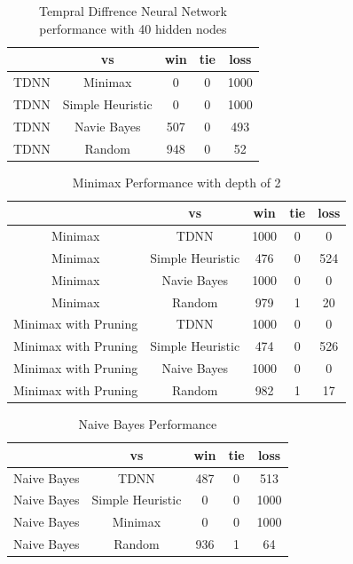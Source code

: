 \documentclass[12pt,letterpaper]{article}
\begin{document}
\begin{table}
\begin{center}
\begin{tabular}{|c||c|c|c|c|}
\hline
& vs & win & tie & loss\\
\hline \hline
TDNN & Minimax & 0 & 0 & 1000\\
\hline 
TDNN & Simple Heuristic & 0 & 0 & 1000\\
\hline 
TDNN & Navie Bayes & 507 & 0 & 493\\
\hline 
TDNN & Random & 948 & 0 & 52\\
\hline 
\end{tabular}
\end{center}
\caption{Tempral Diffrence Neural Network performance with 40 hidden nodes}
\label{TDNNtable}
\end{table}

\begin{table}
\begin{center}
\begin{tabular}{|c||c|c|c|c|}
\hline
& vs & win & tie & loss\\
\hline \hline
Minimax & TDNN & 1000 & 0 & 0\\
\hline 
Minimax & Simple Heuristic & 476 & 0 & 524\\
\hline 
Minimax & Navie Bayes & 1000 & 0 & 0\\
\hline 
Minimax & Random & 979 & 1 & 20\\
\hline 
Minimax with Pruning & TDNN & 1000 & 0 & 0\\
\hline 
Minimax with Pruning & Simple Heuristic & 474 & 0 & 526\\
\hline 
Minimax with Pruning & Naive Bayes & 1000 & 0 & 0\\
\hline 
Minimax with Pruning & Random & 982 & 1 & 17\\
\hline 
\end{tabular}
\end{center}
\caption{Minimax Performance with depth of 2}
\label{MinimaxTable}
\end{table}


\begin{table}
\begin{center}
\begin{tabular}{|c||c|c|c|c|}
\hline
& vs & win & tie & loss\\
\hline \hline
Naive Bayes & TDNN & 487 & 0 & 513\\
\hline 
Naive Bayes & Simple Heuristic & 0 & 0 & 1000\\
\hline 
Naive Bayes & Minimax & 0 & 0 & 1000\\
\hline 
Naive Bayes & Random & 936 & 1 & 64\\
\hline 
\end{tabular}
\end{center}
\caption{Naive Bayes Performance}
\label{NaiveBayesTable}
\end{table}
\end{document}
